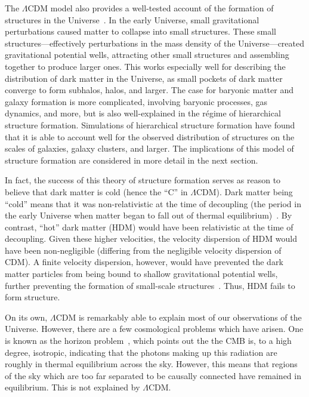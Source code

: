 The \(\Lambda\)CDM model also provides a well-tested account of the formation
of structures in the Universe~\cite{dodelson_modern_2021}. In the early
Universe, small gravitational perturbations caused matter to collapse into
small structures. These small structures---effectively perturbations in
the mass density of the Universe---created gravitational potential wells,
attracting other small structures and assembling together to produce larger
ones. This works especially well for describing the distribution of dark
matter in the Universe, as small pockets of dark matter converge to form
subhalos, halos, and larger. The case for baryonic matter and galaxy formation
is more complicated, involving baryonic processes, gas dynamics, and more, but
is also well-explained in the régime of hierarchical structure formation.
Simulations of hierarchical structure formation have found that it is able to
account well for the observed distribution of structures on the scales of
galaxies, galaxy clusters, and larger. The implications of this model of
structure formation are considered in more detail in the next section.

In fact, the success of this theory of structure formation serves as reason to
believe that dark matter is cold (hence the ``C'' in \(\Lambda\)CDM). Dark
matter being ``cold'' means that it was non-relativistic at the time of
decoupling (the period in the early Universe when matter began to fall out of
thermal equilibrium)~\cite{mohanty_astroparticle_2020}. By contrast, ``hot'' dark matter
(HDM) would have been relativistic at the time of decoupling. Given these
higher velocities, the velocity dispersion of HDM would have been
non-negligible (differing from the negligible velocity dispersion of CDM). A
finite velocity dispersion, however, would have prevented the dark matter
particles from being bound to shallow gravitational potential wells, further
preventing the formation of small-scale
structures~\cite{schneider_extragalactic_2015}. Thus, HDM fails to form
structure.

On its own, \(\Lambda\)CDM is remarkably able to explain most of our
observations of the Universe. However, there are a few cosmological problems
which have arisen. One is known as the horizon
problem~\cite{bergstrom_cosmology_2008,schneider_extragalactic_2015}, which
points out the the CMB is, to a high degree, isotropic, indicating that the
photons making up this radiation are roughly in thermal equilibrium across the
sky. However, this means that regions of the sky which are too far separated
to be causally connected have remained in equilibrium. This is not explained
by \(\Lambda\)CDM.


